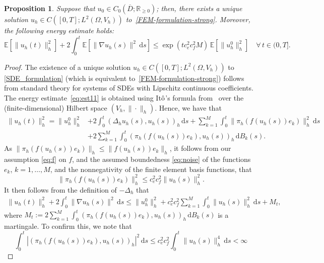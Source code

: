\documentclass[12pt]{article}
\newtheorem{proposition}{Proposition}[section]
\newcommand{\E}{\mathbb{E}}
\newcommand{\dd}{\,\mathrm{d}}
\begin{document}
{\begin{proposition}\label{w-p-uh} Suppose that $u_0 \in C_0(\overline{D};\mathbb{R}_{\geq 0})$; then, 
  there exists a unique solution $u_h \in C([0,T]; L^2(\Omega, V_h))$ to~\eqref{FEM-formulation-strong}. Moreover, the following energy estimate holds:
%  
\begin{equation}\label{eq:est11}
     \E [\| u_h(t) \|_h^2] + 2 \int_0^t \E [\| \nabla u_h (s)\|^2 \dd s] \leq \exp(t c_e^2 c_f^2 M ) \, \E  [\| u_h^0 \|_h^2] \quad \forall\, t \in (0,T].
\end{equation}
%
\end{proposition}
\begin{proof}
     The existence of a unique solution $u_h \in C([0,T]; L^2(\Omega, V_h))$ to \eqref{SDE_formulation} (which is equivalent to~\eqref{FEM-formulation-strong}) follows from standard theory for systems of SDEs with Lipschitz continuous coefficients.     
     The energy estimate~\eqref{eq:est11} is obtained using  It$\hat{\rm{o}}$'s formula from~\cite[Lemma 4.1]{MR651582} 
     over the (finite-dimensional) Hilbert space $(V_h, \| \cdot \|_h)$.    
     Hence, we have that
    \begin{align*}
        \| u_h(t) \|^2_h = \| u_h^0 \|^2_h &+ 2 \int_0^t (\Delta_h u_h(s), u_h(s))_h \dd s + \sum_{k=1}^M \int_0^t \| \pi_h(f(u_h(s))e_k) \|^2_h \dd s  \\
        &+ 2 \sum_{k=1}^M \int_0^t ( \pi_h(f(u_h(s))e_k), u_h(s))_h \dd B_k(s).
    \end{align*}
    As $\| \pi_h(f(u_h(s))e_k) \|_h \leq \| f(u_h(s))e_k \|_h$, it follows from our assumption \eqref{eq:f} on $f$, and the assumed boundedness \eqref{eq:noise} of the functions $e_k$, $k=1,\ldots,M$, and the  nonnegativity of the finite element basis functions, that
    \begin{equation*}
       \| \pi_h(f(u_h(s))e_k) \|_h^2 \leq c_e^2 c_f^2 \|u_h(s)\|_h^2.
    \end{equation*}
    It then follows from the definition of $-\Delta_h$ that
    \begin{align*}
        \| u_h(t) \|^2_h + 2\int_0^t \|\nabla u_h(s) \|^2  \dd s \leq \| u_h^0 \|^2_h 
        + c_e^2 c_f^2 \sum_{k=1}^M \int_0^t \| u_h(s) \|_h^2 \dd s + M_t, 
    \end{align*}
    where $M_t:=  2 \sum_{k=1}^M \int_0^t ( \pi_h(f(u_h(s))e_k), u_h(s))_h \dd B_k(s)$ 
    is a martingale. To confirm this, we note that 
    \[\int_0^t |( \pi_h(f(u_h(s))e_k), u_h(s))_h|^2 \dd s \leq c_e^2 c_f^2  \int_0^t \|u_h(s)\|_h^4\dd s < \infty\]

\end{proof}}
\end{document}

